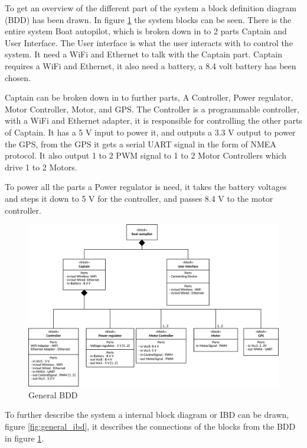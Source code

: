 To get an overview of the different part of the system a block definition diagram (BDD) has been drawn.
In figure \ref{fig:general_bdd} the system blocks can be seen. There is the entire system Boat autopilot, which is broken down in to 2 parts Captain and User Interface. The User interface is what the user interacts with to control the system. It need a WiFi and Ethernet to talk with the Captain part. Captain requires a WiFi and Ethernet, it also need a battery, a 8.4 volt battery has been chosen. 

Captain can be broken down in to further parts, A Controller, Power regulator, Motor Controller, Motor, and GPS.
The Controller is a programmable controller, with a WiFi and Ethernet adapter, it is responsible for controlling the other parts of Captain. It has a 5 V input to power it, and outputs a 3.3 V output to power the GPS, from the GPS it gets a serial UART signal in the form of NMEA protocol. It also output 1 to 2 PWM signal to 1 to 2 Motor Controllers which drive 1 to 2 Motors.

To power all the parts a Power regulator is need, it takes the battery voltages and steps it down to 5 V for the controller, and passes 8.4 V to the motor controller.

\begin{figure}[H]
	\centering
	\includegraphics[width=1\linewidth]{Images/System_architecture/General_BDD}
	\caption{General BDD}
	\label{fig:general_bdd}
\end{figure}

To further describe the system a internal block diagram or IBD can be drawn, figure \ref{fig:general_ibd}, it describes the connections of the blocks from the BDD in figure \ref{fig:general_bdd}. 


